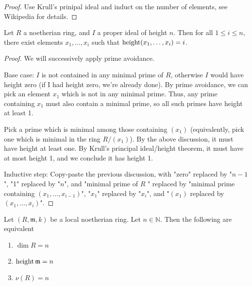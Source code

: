 \begin{proof}
    Use Krull's prinipal ideal and induct on the 
    number of elements, see Wikipedia for details.
\end{proof}

\begin{theorem}
    \label{thm:genset_of_any_height_of_noetherian_height_n}
    Let \(R\) a noetherian ring, and \(I\) a proper 
    ideal of height \(n\).
    Then for all \(1 \leq i \leq n\),
    there exist elements \(x_{1}, \ldots, x_{i}\)
    such that
    \(\operatorname{height} (x_{1}, \ldots, x_{i}) = i\).
\end{theorem}

\begin{proof}
    We will successively apply prime avoidance.

    Base case: 
    \(I\) is not contained in any minimal prime of \(R\),
    otherwise \(I\) would have height zero (if I had height
    zero, we're already done).
    By prime avoidance, we can pick an element \(x_{1}\) which is
    not in any minimal prime. 
    Thus, any prime containing \(x_{1}\) must also contain a minimal prime, so
    all such primes have height at least 1.
    
    Pick a prime which is minimal among those containing \((x_{1})\)
    (equivalently, pick one which is minimal in the ring \(R / (x_{1})\)).
    By the above discussion, it must have height at least one. 
    By Krull's principal ideal/height theorem, it must have at most height 1,
    and we conclude it has height 1.

    Inductive step:
    Copy-paste the previous discussion, with "zero" replaced by "\(n-1\)",
    "1" replaced by "\(n\)", and "minimal prime of \(R\) " replaced by
    "minimal prime containing \((x_{1}, \ldots, x_{i-1})\)", 
    "\(x_{1}\)" replaced by "\(x_{i}\)", and
    "\((x_{1})\) replaced by \((x_{1}, \ldots, x_{i})\)".
   
\end{proof}


\begin{theorem}
    \label{thm:dimension_theorem}
    Let \((R,\mathfrak{m},k)\) be a local noetherian ring.
    Let \(n \in \mathbb{N}\).
    Then the following are equivalent
    \begin{enumerate}
        \item[(a)] \(\dim R = n\)
        \item[(b)] \(\operatorname{height} \mathfrak{m} = n\)
        \item[(c)] \(\nu(R) = n\)
    \end{enumerate}
\end{theorem}


